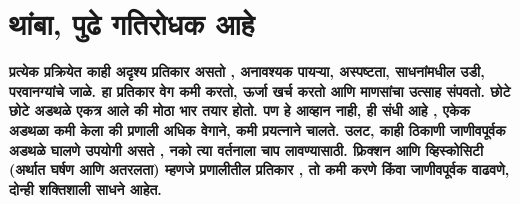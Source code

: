 \chapter{थांबा, पुढे गतिरोधक आहे}

\textcolor{blue!60!black}{\textbf{प्रत्येक प्रक्रियेत काही अदृश्य प्रतिकार असतो , अनावश्यक पायऱ्या, अस्पष्टता, साधनांमधील उडी, परवानग्यांचे जाळे. हा प्रतिकार वेग कमी करतो, ऊर्जा खर्च करतो आणि माणसांचा उत्साह संपवतो. छोटे छोटे अडथळे एकत्र आले की मोठा भार तयार होतो. पण हे आव्हान नाही, ही संधी आहे , एकेक अडथळा कमी केला की प्रणाली अधिक वेगाने, कमी प्रयत्नाने चालते. उलट, काही ठिकाणी जाणीवपूर्वक अडथळे घालणे उपयोगी असते , नको त्या वर्तनाला चाप लावण्यासाठी. फ्रिक्शन आणि व्हिस्कोसिटी (अर्थात घर्षण आणि अतरलता) म्हणजे प्रणालीतील प्रतिकार , तो कमी करणे किंवा जाणीवपूर्वक वाढवणे, दोन्ही शक्तिशाली साधने आहेत.}}

